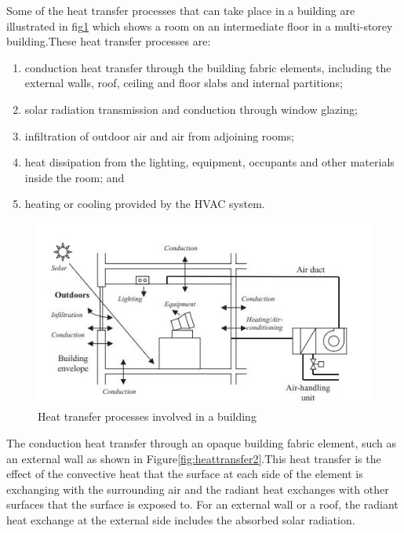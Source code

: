 \documentclass[a4paper,12pt]{report}
\numberwithin{equation}{section}
\begin{document}
Some of the heat transfer processes that can take place in a building are illustrated in fig\ref{fig:heattransfer1} which shows a room on an intermediate floor in a multi-storey building.These heat transfer processes are:
\begin{enumerate}
    \item conduction heat transfer through the building fabric elements, including the external
walls, roof, ceiling and floor slabs and internal partitions;
    \item solar radiation transmission and conduction through window glazing;
    \item infiltration of outdoor air and air from adjoining rooms;
    \item heat dissipation from the lighting, equipment, occupants and other materials inside the room; and
    \item heating or cooling  provided by the HVAC system.
\end{enumerate}

\begin{figure}[H]
    \includegraphics[scale=1.3]{heat_transfer.JPG}
    \centering
    \caption{Heat transfer processes involved in a building}
    \label{fig:heattransfer1}
\end{figure}

The conduction heat transfer through an opaque building fabric element, such as an external
wall as shown in Figure\ref{fig:heattransfer2}.This heat transfer is the effect of the convective heat that the surface at each side of the element is exchanging with the surrounding air and the radiant heat exchanges with other surfaces that the surface is exposed to. For an external wall or a roof, the radiant heat exchange at the external side includes the absorbed solar radiation.
\end{document}

